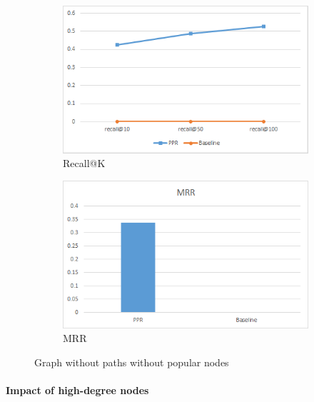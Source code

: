 \documentclass[11pt,oneside]{book}
\begin{document}
\begin{figure}[h]
\centering
\begin{subfigure}[b]{0.49\textwidth}
	\centering
\includegraphics[scale=0.49]{figures/minlen2remove500.png}
\caption{Recall@K}
\label{fig:minlen2remove500Recall}
\end{subfigure}
\begin{subfigure}[b]{0.49\textwidth}
	\centering
\includegraphics[scale=0.49]{figures/minlen2remove500MRR.png}
\caption{MRR}
\label{fig:minlen2remove500MRR}
\end{subfigure}
	\caption{Graph without paths without popular nodes}
	\label{fig:minlen2remove500}
\end{figure}

\paragraph{Impact of high-degree nodes}
\end{document}
